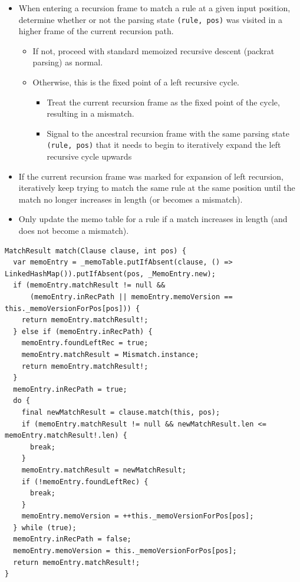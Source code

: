 \documentclass[manuscript]{acmart}
\begin{document}
\begin{itemize}
    \item When entering a recursion frame to match a rule at a given input position, determine whether or not the parsing state \texttt{(rule, pos)} was visited in a higher frame of the current recursion path.
    \begin{itemize}
        \item If not, proceed with standard memoized recursive descent (packrat parsing) as normal.
        \item Otherwise, this is the fixed point of a left recursive cycle.
        \begin{itemize}
            \item Treat the current recursion frame as the fixed point of the cycle, resulting in a mismatch.
            \item Signal to the ancestral recursion frame with the same parsing state \texttt{(rule, pos)} that it needs to begin to iteratively expand the left recursive cycle upwards
        \end{itemize}
    \end{itemize}
    \item If the current recursion frame was marked for expansion of left recursion, iteratively keep trying to match the same rule at the same position until the match no longer increases in length (or becomes a mismatch).
    \item Only update the memo table for a rule if a match increases in length (and does not become a mismatch).
\end{itemize}

\begin{listing}[!ht]
\begin{verbatim}
MatchResult match(Clause clause, int pos) {
  var memoEntry = _memoTable.putIfAbsent(clause, () => LinkedHashMap()).putIfAbsent(pos, _MemoEntry.new);
  if (memoEntry.matchResult != null &&
      (memoEntry.inRecPath || memoEntry.memoVersion == this._memoVersionForPos[pos])) {
    return memoEntry.matchResult!;
  } else if (memoEntry.inRecPath) {
    memoEntry.foundLeftRec = true;
    memoEntry.matchResult = Mismatch.instance;
    return memoEntry.matchResult!;
  }
  memoEntry.inRecPath = true;
  do {
    final newMatchResult = clause.match(this, pos);
    if (memoEntry.matchResult != null && newMatchResult.len <= memoEntry.matchResult!.len) {
      break;
    }
    memoEntry.matchResult = newMatchResult;
    if (!memoEntry.foundLeftRec) {
      break;
    }
    memoEntry.memoVersion = ++this._memoVersionForPos[pos];
  } while (true);
  memoEntry.inRecPath = false;
  memoEntry.memoVersion = this._memoVersionForPos[pos];
  return memoEntry.matchResult!;
}
\end{verbatim}
\caption{The squirrel parser algorithm}
\label{listing:2}
\end{listing}
\end{document}
